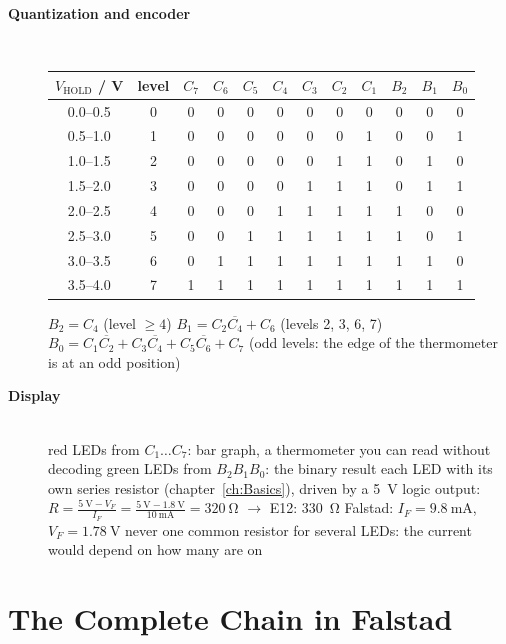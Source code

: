 \begin{description}
\item[{\rot\bf Quantization and encoder}]~\\[-\lblskip]
\begin{center}
\small
\begin{tabular}{cc|ccccccc|ccc}
\toprule
$V_\mathrm{HOLD}$ / V & level & $C_7$ & $C_6$ & $C_5$ & $C_4$ & $C_3$ & $C_2$ & $C_1$ & $B_2$ & $B_1$ & $B_0$ \\
\midrule
0.0--0.5 & 0 & 0&0&0&0&0&0&0 & 0&0&0 \\
0.5--1.0 & 1 & 0&0&0&0&0&0&1 & 0&0&1 \\
1.0--1.5 & 2 & 0&0&0&0&0&1&1 & 0&1&0 \\
1.5--2.0 & 3 & 0&0&0&0&1&1&1 & 0&1&1 \\
2.0--2.5 & 4 & 0&0&0&1&1&1&1 & 1&0&0 \\
2.5--3.0 & 5 & 0&0&1&1&1&1&1 & 1&0&1 \\
3.0--3.5 & 6 & 0&1&1&1&1&1&1 & 1&1&0 \\
3.5--4.0 & 7 & 1&1&1&1&1&1&1 & 1&1&1 \\
\bottomrule
\end{tabular}
\end{center}
\bi
	\ite $B_2 = C_4$ \quad (level $\geq 4$)
	\ite $B_1 = C_2\overline{C_4} + C_6$ \quad (levels 2, 3, 6, 7)
	\ite $B_0 = C_1\overline{C_2} + C_3\overline{C_4} + C_5\overline{C_6} + C_7$ \quad (odd levels: the edge of the thermometer is at an odd position)
\ei
\os{\newpage}

\item[{\rot\bf Display}]~\\[-\lblskip]
\bi
	 red LEDs from $C_1\ldots C_7$: bar graph, a thermometer you can read without decoding
	 green LEDs from $B_2B_1B_0$: the binary result
	\ite each LED with its own series resistor (chapter~\ref{ch:Basics}), driven by a \SI{5}{\volt} logic output:
	$R = \frac{\SI{5}{\volt}-V_F}{I_F} = \frac{\SI{5}{\volt}-\SI{1.8}{\volt}}{\SI{10}{\milli\ampere}} = \SI{320}{\ohm}$ $\rightarrow$ E12: \SI{330}{\ohm}
	\itee Falstad: $I_F = \SI{9.8}{\milli\ampere}$, $V_F = \SI{1.78}{\volt}$
	\ite never one common resistor for several LEDs: the current would depend on how many are on
\ei
\os{\newpage}
\end{description}

\section{The Complete Chain in Falstad}

